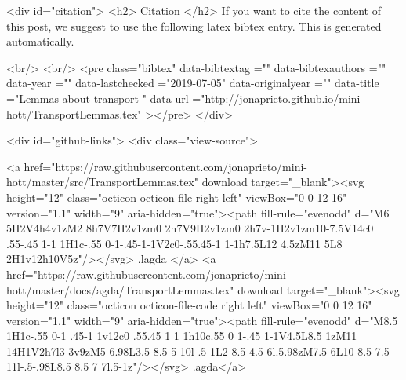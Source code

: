 {{  
  <div id="citation">
  <h2> Citation </h2>
  If you want to cite the content of this post,
  we suggest to use the following latex bibtex entry.
  This is generated automatically.

  <br/>
  <br/>
  <pre class="bibtex"
       data-bibtextag =""
       data-bibtexauthors =""
       data-year =""
       data-lastchecked ="2019-07-05"
       data-originalyear =""
       data-title ="Lemmas about transport "
       data-url ="http://jonaprieto.github.io/mini-hott/TransportLemmas.tex"
  ></pre>
  </div>
  

  <div id="github-links">
    <div class="view-source">
      
        <a href="https://raw.githubusercontent.com/jonaprieto/mini-hott/master/src/TransportLemmas.tex" download target="_blank"><svg height="12" class="octicon octicon-file right left" viewBox="0 0 12 16" version="1.1" width="9" aria-hidden="true"><path fill-rule="evenodd" d="M6 5H2V4h4v1zM2 8h7V7H2v1zm0 2h7V9H2v1zm0 2h7v-1H2v1zm10-7.5V14c0 .55-.45 1-1 1H1c-.55 0-1-.45-1-1V2c0-.55.45-1 1-1h7.5L12 4.5zM11 5L8 2H1v12h10V5z"/></svg> .lagda </a>
        <a href="https://raw.githubusercontent.com/jonaprieto/mini-hott/master/docs/agda/TransportLemmas.tex" download target="_blank"><svg height="12" class="octicon octicon-file-code right left" viewBox="0 0 12 16" version="1.1" width="9" aria-hidden="true"><path fill-rule="evenodd" d="M8.5 1H1c-.55 0-1 .45-1 1v12c0 .55.45 1 1 1h10c.55 0 1-.45 1-1V4.5L8.5 1zM11 14H1V2h7l3 3v9zM5 6.98L3.5 8.5 5 10l-.5 1L2 8.5 4.5 6l.5.98zM7.5 6L10 8.5 7.5 11l-.5-.98L8.5 8.5 7 7l.5-1z"/></svg> .agda</a>
      
}}

